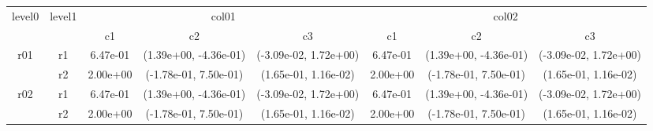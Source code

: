 \begin{tabular}{cccccccc}
\toprule
\multirow{2}{*}{level0} & \multirow{2}{*}{level1}&\multicolumn{3}{c}{col01}&\multicolumn{3}{c}{col02}\tabularnewline
\cmidrule(lr){3-5}
\cmidrule(lr){6-8}
&&c1&c2&c3&c1&c2&c3\tabularnewline
\midrule
\midrule
\multirow{2}{*}{r01}&r1&6.47e-01& (1.39e+00, -4.36e-01)& (-3.09e-02, 1.72e+00)&6.47e-01& (1.39e+00, -4.36e-01)& (-3.09e-02, 1.72e+00)\tabularnewline
&r2&2.00e+00& (-1.78e-01, 7.50e-01)& (1.65e-01, 1.16e-02)&2.00e+00& (-1.78e-01, 7.50e-01)& (1.65e-01, 1.16e-02)\tabularnewline
\midrule
\multirow{2}{*}{r02}&r1&6.47e-01& (1.39e+00, -4.36e-01)& (-3.09e-02, 1.72e+00)&6.47e-01& (1.39e+00, -4.36e-01)& (-3.09e-02, 1.72e+00)\tabularnewline
&r2&2.00e+00& (-1.78e-01, 7.50e-01)& (1.65e-01, 1.16e-02)&2.00e+00& (-1.78e-01, 7.50e-01)& (1.65e-01, 1.16e-02)\tabularnewline
\bottomrule
\end{tabular}
